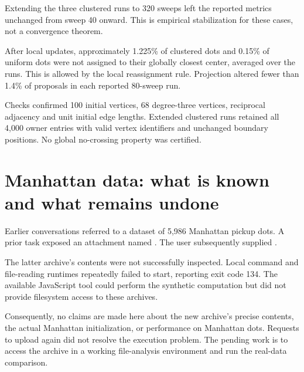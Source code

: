 \documentclass[11pt]{article}
\begin{document}
Extending the three clustered runs to 320 sweeps left the reported metrics unchanged from sweep 40 onward. This is empirical stabilization for these cases, not a convergence theorem.

After local updates, approximately 1.225\% of clustered dots and 0.15\% of uniform dots were not assigned to their globally closest center, averaged over the runs. This is allowed by the local reassignment rule. Projection altered fewer than 1.4\% of proposals in each reported 80-sweep run.

Checks confirmed 100 initial vertices, 68 degree-three vertices, reciprocal adjacency and unit initial edge lengths. Extended clustered runs retained all 4,000 owner entries with valid vertex identifiers and unchanged boundary positions. No global no-crossing property was certified.

\section{Manhattan data: what is known and what remains undone}
Earlier conversations referred to a dataset of 5,986 Manhattan pickup dots. A prior task exposed an attachment named . The user subsequently supplied .

The latter archive's contents were not successfully inspected. Local command and file-reading runtimes repeatedly failed to start, reporting exit code 134. The available JavaScript tool could perform the synthetic computation but did not provide filesystem access to these archives.

Consequently, no claims are made here about the new archive's precise contents, the actual Manhattan initialization, or performance on Manhattan dots. Requests to upload again did not resolve the execution problem. The pending work is to access the archive in a working file-analysis environment and run the real-data comparison.
\end{document}
